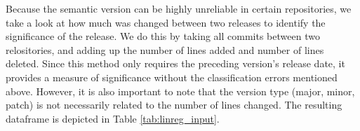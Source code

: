 \begin{table}
    \centering
    \caption{OLS regression input data. (b=before, a=after)}
    \label{tab:linreg_input}
\end{table}

Because the semantic version can be highly unreliable in certain repositories, we take a look at how much was changed between two releases to identify the significance of the release. We do this by taking all commits between two relositories, and adding up the number of lines added and number of lines deleted. Since this method only requires the preceding version's release date, it provides a measure of significance without the classification errors mentioned above. However, it is also important to note that the version type (major, minor, patch) is not necessarily related to the number of lines changed. The resulting dataframe is depicted in Table \ref{tab:linreg_input}.

